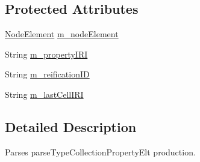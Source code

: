 \subsection*{Protected Attributes}
\begin{DoxyCompactItemize}
\item 
\hyperlink{classorg_1_1semanticweb_1_1owlapi_1_1rdf_1_1syntax_1_1_r_d_f_parser_1_1_node_element}{Node\-Element} \hyperlink{classorg_1_1semanticweb_1_1owlapi_1_1rdf_1_1syntax_1_1_r_d_f_parser_1_1_parse_type_collection_property_element_adb0d706f29ca363c38eacacd0ee4afe4}{m\-\_\-node\-Element}
\item 
String \hyperlink{classorg_1_1semanticweb_1_1owlapi_1_1rdf_1_1syntax_1_1_r_d_f_parser_1_1_parse_type_collection_property_element_aa3ae55b07fcf24733f682d46ba6b6a16}{m\-\_\-property\-I\-R\-I}
\item 
String \hyperlink{classorg_1_1semanticweb_1_1owlapi_1_1rdf_1_1syntax_1_1_r_d_f_parser_1_1_parse_type_collection_property_element_a193bc4d1036d7bdd9286003c8d0bcefe}{m\-\_\-reification\-I\-D}
\item 
String \hyperlink{classorg_1_1semanticweb_1_1owlapi_1_1rdf_1_1syntax_1_1_r_d_f_parser_1_1_parse_type_collection_property_element_a851626da505674dc5db975fac5b33dc4}{m\-\_\-last\-Cell\-I\-R\-I}
\end{DoxyCompactItemize}


\subsection{Detailed Description}
Parses parse\-Type\-Collection\-Property\-Elt production. 

